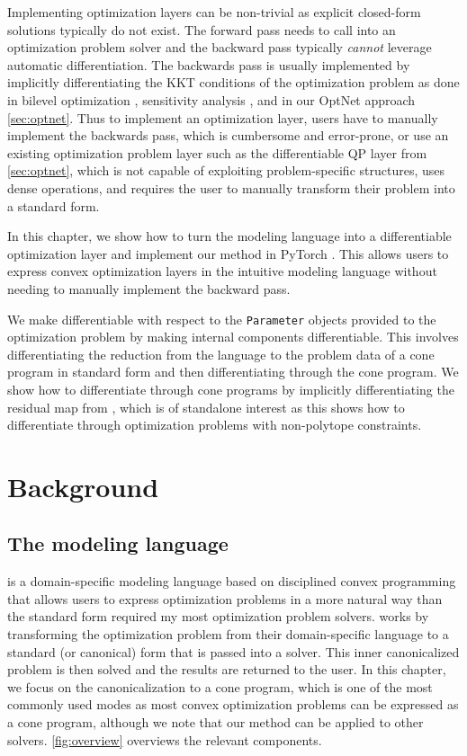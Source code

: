 Implementing optimization layers can be non-trivial as explicit
closed-form solutions typically do not exist.
The forward pass needs to call into an optimization
problem solver and the backward pass typically
\emph{cannot} leverage automatic differentiation.
The backwards pass is usually implemented by implicitly
differentiating the KKT conditions of the optimization problem
as done in bilevel optimization
\citep{gould2016differentiating,kunisch2013bilevel},
sensitivity analysis
\citep{bertsekas1999nonlinear,fiacco1990sensitivity,bonnans2013perturbation},
and in our OptNet approach \cref{sec:optnet}.
Thus to implement an optimization layer, users
have to manually implement the backwards pass,
which is cumbersome and error-prone,
or use an existing optimization problem layer such as
the differentiable QP layer from \cref{sec:optnet},
which is not capable of exploiting problem-specific
structures, uses dense operations, and requires
the user to manually transform their problem into
a standard form.

In this chapter, we show how to turn the \cvxpy
modeling language \citep{diamond2016cvxpy} into
a differentiable optimization layer and
implement our method in PyTorch \citep{paszke2017automatic}.
This allows users to express convex optimization layers in
the intuitive \cvxpy modeling language without needing
to manually implement the backward pass.

We make \cvxpy differentiable with respect to the
\texttt{Parameter} objects provided to the optimization problem
by making internal \cvxpy components differentiable.
This involves differentiating the reduction from the \cvxpy
language to the problem data of a cone program in standard form
and then differentiating through the cone program.
We show how to differentiate through cone programs by
implicitly differentiating the residual map from
\citet{busseti2018solution},
which is of standalone interest as
this shows how to differentiate through optimization
problems with non-polytope constraints.

\section{Background}
\subsection{The \cvxpy modeling language}
\label{sec:bg:cvxpy}
\cvxpy \citep{diamond2016cvxpy}
is a domain-specific modeling language
based on disciplined convex programming
\citep{grant2006disciplined}
that allows users to express optimization problems
in a more natural way than the standard form
required my most optimization problem solvers.
\cvxpy works by transforming the optimization
problem from their domain-specific language to a
standard (or canonical) form that is passed into
a solver. This inner canonicalized problem is
then solved and the results are returned to
the user. In this chapter, we focus on the
canonicalization to a cone program, which is
one of the most commonly used modes as most convex
optimization problems can be expressed as a cone program,
although we note that our method can be
applied to other \cvxpy solvers.
\cref{fig:overview} overviews the relevant
\cvxpy components.

